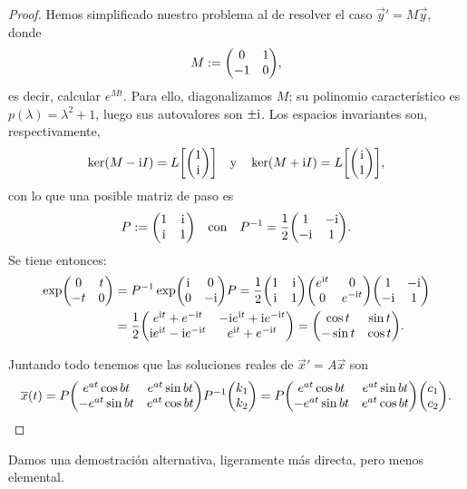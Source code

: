 \documentclass[../ecuaciones_diferenciales.tex]{subfiles}
\begin{document}
\begin{proof}
	Hemos simplificado nuestro problema al de resolver el caso 
	\(\vec{y}' = M\vec{y}\), donde
	\[M := \mat{0 & 1 \\ -1 & 0},\]
	es decir, calcular \(e^{Mt}\).
	Para ello, diagonalizamos \(M\); su polinomio característico es 
	\(p(\lambda) = \lambda^2 + 1\), luego sus
	autovalores son \(\pm \mathrm{i}\). Los espacios invariantes son, respectivamente,
	\[\ker(M - \iu I) = L\left[\mat{1 \\ \iu}\right] 
		\quad \text{y} \quad 
		\ker(M + \iu I) = L\left[\mat{\iu \\ 1}\right],\]
	con lo que una posible matriz de paso es 
	\[P := \mat{1 & \iu \\ \iu & 1} \quad \text{con} \quad 
		P^{-1} = \frac{1}{2} \mat{1 & -\iu \\ -\iu & 1}.\]
	Se tiene entonces:
	\begin{align*}
		\exp \mat{0 & t \\ -t & 0} &= P^{-1} \exp\mat{\iu & 0 \\ 0 & -\iu} P =
		\frac{1}{2} \mat{1 & \iu \\ \iu & 1}
		\mat{e^{\iu t} & 0 \\ 0 & e^{-\iu t}} \mat {1 & -\iu \\ -\iu & 1} \\
		&= \frac{1}{2} 
		\mat{e^{\iu t} + e^{-\iu t} & -\iu e^{\iu t} + \iu e^{-\iu t} \\
		\iu e^{\iu t} - \iu e^{-\iu t} & e^{\iu t} + e^{-\iu t}} 
		= \mat{\cos t & \sin t \\ -\sin t & \cos t}.
	\end{align*}

	Juntando todo tenemos que las soluciones reales de \(\vec{x}' = A\vec{x}\) 
	son
	\[\vec{x}(t) = P 
		\mat{e^{at}\cos bt & e^{at}\sin bt \\
			-e^{at} \sin bt & e^{at} \cos bt} P^{-1} 
		\mat{k_1 \\ k_2} 
		= P \mat{e^{at}\cos bt & e^{at}\sin bt \\
			-e^{at} \sin bt & e^{at} \cos bt} \mat {c_1 \\ c_2}.\]
\end{proof}

Damos una demostración alternativa, ligeramente más directa, pero menos 
elemental.
\end{document}
